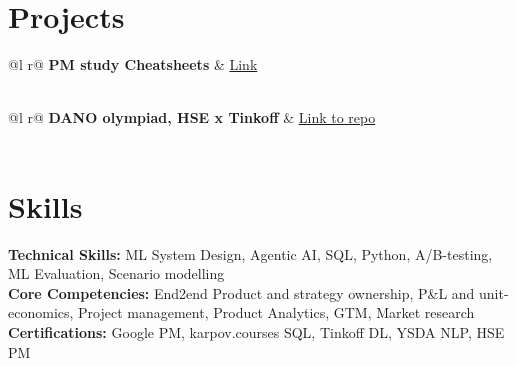 \documentclass[a4paper,12pt]{article}
\begin{document}
\section{Projects}

\begin{tabularx}{\linewidth}{ @{}l r@{} }
\textbf{PM study Cheatsheets} & \hfill \href{https://slavikss.github.io/blog}{Link} \\[3.75pt]
  \\
\end{tabularx}

\begin{tabularx}{\linewidth}{ @{}l r@{} }
\textbf{DANO olympiad, HSE x Tinkoff} & \hfill \href{https://github.com/Slavikss/tinkoff-cinema-tickets}{Link to repo} \\[3.75pt]
  \\
\end{tabularx}


\section{Skills}
\textbf{Technical Skills:} ML System Design, Agentic AI, SQL, Python, A/B-testing, ML Evaluation, Scenario modelling \\
\textbf{Core Competencies:} End2end Product and strategy ownership, P\&L and unit-economics, Project management, Product Analytics, GTM, Market research \\
\textbf{Certifications:} Google PM, karpov.courses SQL, Tinkoff DL, YSDA NLP, HSE PM \\

\enlargethispage{-\baselineskip}
\end{document}
